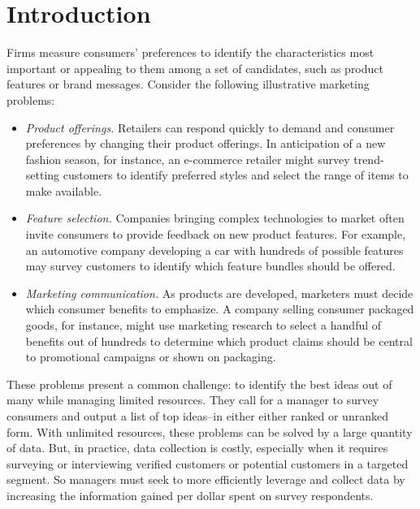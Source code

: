 \documentclass[nonblindrev]{informs3}
\begin{document}
\section{Introduction}

Firms measure consumers' preferences to identify the characteristics most important or appealing to them among a set of candidates, such as product features or brand messages. Consider the following illustrative marketing problems:

\begin{itemize}


\item \emph{Product offerings.} Retailers can respond quickly to demand and consumer preferences by changing their product offerings. In anticipation of a new fashion season, for instance, an e-commerce retailer might survey trend-setting customers to identify preferred styles and select the range of items to make available.
\item \emph{Feature selection.} Companies bringing complex technologies to market often invite consumers to provide feedback on new product features. For example, an automotive company developing a car with hundreds of possible features may survey customers to identify which feature bundles should be offered.
\item \emph{Marketing communication.} As products are developed, marketers must decide which consumer benefits to emphasize. A company selling consumer packaged goods, for instance, might use marketing research to select a handful of benefits out of hundreds to determine which product claims should be central to promotional campaigns or shown on packaging. 
\end{itemize}

These problems present a common challenge: to identify the best ideas out of many while managing limited resources. They call for a manager to survey consumers and output a list of top ideas--in either either ranked or unranked form. With unlimited resources, these problems can be solved by a large quantity of data. But, in practice, data collection is costly, especially when it requires surveying or interviewing verified customers or potential customers in a targeted segment. So managers must seek to more efficiently leverage and collect data by increasing the information gained per dollar spent on survey respondents. 
\end{document}
